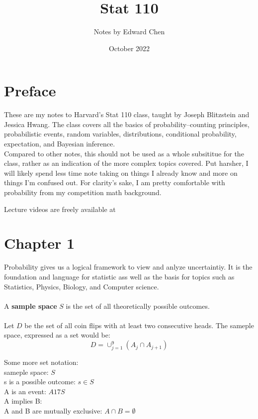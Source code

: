 \documentclass{article}
\title{Stat 110}
\author{Notes by Edward Chen}
\date{October 2022}
\begin{document}
    \maketitle
    \section*{Preface}

These are my notes to Harvard's Stat 110 class,
taught by Joseph Blitzstein and Jessica Hwang. The class covers all the basics of probability--counting principles,
probabilistic events, random variables, distributions, conditional probability, expectation, and Bayesian inference.\\

    Compared to other notes, this should not be used as a whole subsititue for the class, rather as an indication of the more complex topics covered.
    Put harsher, I will likely spend less time note taking on things I already know and more on things I'm confused out. For clarity's sake,
    I am pretty comfortable with probability from my competition math background.

    Lecture videos are freely available at 


    \section{Chapter 1}

    Probability gives us a logical framework to view and anlyze uncertaintiy. It is the foundation and language for statistic ass well as the basis
        for topics such as Statistics, Physics, Biology, and Computer science.\\\\

    A \textbf{sample space} $S$ is the set of all theoretically possible outcomes.\\\\

    Let $D$ be the set of all coin flips with at least two consecutive heads. The sameple space,
     expressed as a set would be:
        $$D = \cup_{j=1}^9(A_j\cap A_{j+1})$$

    Some more set notation:\\
        sameple space: $S$\\
        s is a possible outcome: $s\in S$\\
        A is an event: $A 17 S$\\
        A implies B: \\
        A and B are mutually exclusive: $A\cap B = \emptyset$\\\\
\end{document}

